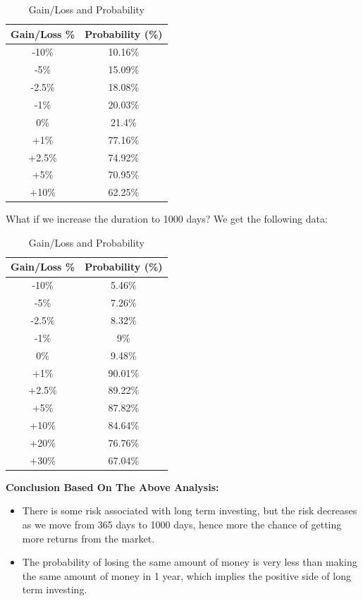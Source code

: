\documentclass[11pt]{article}
\begin{document}
\begin{table}[ht]
  \centering
  \caption{Gain/Loss and Probability}
  \begin{tabular}{cc}
    \toprule
    \textbf{Gain/Loss \%} & \textbf{Probability (\%)} \\
    \midrule
    -10\% & 10.16\% \\
    -5\% & 15.09\% \\
    -2.5\% & 18.08\% \\
    -1\% & 20.03\% \\
    0\% & 21.4\% \\
    +1\% & 77.16\% \\
    +2.5\% & 74.92\% \\
    +5\% & 70.95\% \\
    +10\% & 62.25\% \\
    \bottomrule
  \end{tabular}
\end{table}
\vspace{2mm}

What if we increase the duration to 1000 days? We get the following data:

\begin{table}[ht]
  \centering
  \caption{Gain/Loss and Probability}
  \begin{tabular}{cc}
    \toprule
    \textbf{Gain/Loss \%} & \textbf{Probability (\%)} \\
    \midrule
    -10\% & 5.46\% \\
    -5\% & 7.26\% \\
    -2.5\% & 8.32\% \\
    -1\% & 9\% \\
    0\% & 9.48\% \\
    +1\% & 90.01\% \\
    +2.5\% & 89.22\% \\
    +5\% & 87.82\% \\
    +10\% & 84.64\% \\
    +20\% & 76.76\% \\
    +30\% & 67.04\% \\
    \bottomrule
  \end{tabular}
\end{table}

\vspace{10mm}
\textbf{Conclusion Based On The Above Analysis:} 
\begin{itemize}
\item There is some risk associated with long term investing, but the risk decreases as we move from 365 days to 1000 days, hence more the chance of getting more returns from the market.
\item The probability of losing the same amount of money is very less than making the same amount of money in 1 year, which implies the positive side of long term investing.
\end{itemize}
\end{document}
